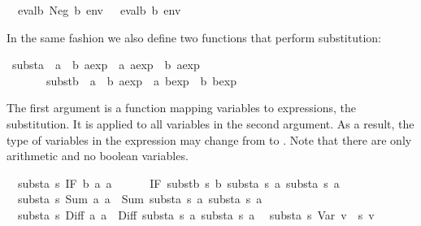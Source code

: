\begin{isabellebody}
\ \ {\isachardoublequote}evalb\ {\isacharparenleft}Neg\ b{\isacharparenright}\ env\ {\isacharequal}\ {\isacharparenleft}{\isasymnot}\ evalb\ b\ env{\isacharparenright}{\isachardoublequote}\isamarkupfalse%
%
\begin{isamarkuptext}%
\noindent
In the same fashion we also define two functions that perform substitution:%
\end{isamarkuptext}%
\isamarkuptrue%
\ substa\ {\isacharcolon}{\isacharcolon}\ {\isachardoublequote}{\isacharparenleft}{\isacharprime}a\ {\isasymRightarrow}\ {\isacharprime}b\ aexp{\isacharparenright}\ {\isasymRightarrow}\ {\isacharprime}a\ aexp\ {\isasymRightarrow}\ {\isacharprime}b\ aexp{\isachardoublequote}\isanewline
\ \ \ \ \ \ \ substb\ {\isacharcolon}{\isacharcolon}\ {\isachardoublequote}{\isacharparenleft}{\isacharprime}a\ {\isasymRightarrow}\ {\isacharprime}b\ aexp{\isacharparenright}\ {\isasymRightarrow}\ {\isacharprime}a\ bexp\ {\isasymRightarrow}\ {\isacharprime}b\ bexp{\isachardoublequote}\isamarkupfalse%
%
\begin{isamarkuptext}%
\noindent
The first argument is a function mapping variables to expressions, the
substitution. It is applied to all variables in the second argument. As a
result, the type of variables in the expression may change from 
to . Note that there are only arithmetic and no boolean variables.%
\end{isamarkuptext}%
\isamarkuptrue%
\isanewline
\ \ {\isachardoublequote}substa\ s\ {\isacharparenleft}IF\ b\ a{}\ a{}{\isacharparenright}\ {\isacharequal}\isanewline
\ \ \ \ \ IF\ {\isacharparenleft}substb\ s\ b{\isacharparenright}\ {\isacharparenleft}substa\ s\ a{}{\isacharparenright}\ {\isacharparenleft}substa\ s\ a{}{\isacharparenright}{\isachardoublequote}\isanewline
\ \ {\isachardoublequote}substa\ s\ {\isacharparenleft}Sum\ a{}\ a{}{\isacharparenright}\ {\isacharequal}\ Sum\ {\isacharparenleft}substa\ s\ a{}{\isacharparenright}\ {\isacharparenleft}substa\ s\ a{}{\isacharparenright}{\isachardoublequote}\isanewline
\ \ {\isachardoublequote}substa\ s\ {\isacharparenleft}Diff\ a{}\ a{}{\isacharparenright}\ {\isacharequal}\ Diff\ {\isacharparenleft}substa\ s\ a{}{\isacharparenright}\ {\isacharparenleft}substa\ s\ a{}{\isacharparenright}{\isachardoublequote}\isanewline
\ \ {\isachardoublequote}substa\ s\ {\isacharparenleft}Var\ v{\isacharparenright}\ {\isacharequal}\ s\ v{\isachardoublequote}\isanewline

\end{isabellebody}
